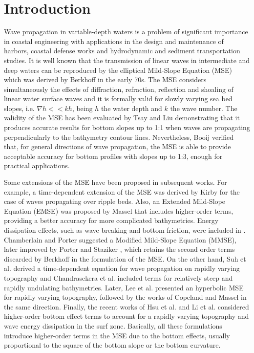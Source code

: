 \section{Introduction}
\label{sec-Introduction}
Wave propagation in variable-depth waters is a problem of significant importance in coastal engineering with applications in the design and maintenance of harbors, coastal defense works and hydrodynamic and sediment transportation studies. It is well known that the transmission of linear waves in intermediate and deep waters can be reproduced by the elliptical Mild-Slope Equation (MSE) which was derived by Berkhoff \cite{Berkhoff1972} in the early 70s. The MSE considers simultaneously the effects of diffraction, refraction, reflection and shoaling of linear water surface waves and it is formally valid for slowly varying sea bed slopes, i.e. $\nabla h << kh$, being $h$ the water depth and $k$ the wave number. The validity of the MSE has been evaluated by Tsay and Liu \cite{Tsay1983} demonstrating that it produces accurate results for bottom slopes up to 1:1 when waves are propagating perpendicularly to the bathymetry contour lines. Nevertheless, Booij \cite{Booij1983} verified that, for general directions of wave propagation, the MSE is able to provide acceptable accuracy for bottom profiles with slopes up to 1:3, enough for practical applications.

Some extensions of the MSE have been proposed in subsequent works. For example, a time-dependent extension of the MSE was derived by Kirby \cite{Kirby1986-JFM} for the case of waves propagating over ripple beds.  Also, an Extended Mild-Slope Equation (EMSE) was proposed by Massel \cite{Massel1993} that includes higher-order terms, providing a better accuracy for more complicated bathymetries. Energy dissipation effects, such as wave breaking and bottom friction, were included in \cite{Maa2002}. Chamberlain and Porter \cite{Chamberlain1995} suggested a Modified Mild-Slope Equation (MMSE), later improved by Porter and Staziker \cite{Porter1995}, which retains the second order terms discarded by Berkhoff in the formulation of the MSE. On the other hand, Suh et al. \cite{Suh1997} derived a time-dependent equation for wave propagation on rapidly varying topography and Chandrasekera et al. \cite{Chandrasekera1997} included terms for relatively steep and rapidly undulating bathymetries. Later, Lee et al. \cite{Lee1998} presented an hyperbolic MSE for rapidly varying topography, followed by the works of Copeland \cite{Copeland1985} and Massel \cite{Massel1993} in the same direction. Finally, the recent works of Hsu et al. \cite{Hsu2001} and Li et al. \cite{Li1994,Hsu2000} considered higher-order bottom effect terms to account for a rapidly varying topography and wave energy dissipation in the surf zone. Basically, all these formulations introduce higher-order terms in the MSE due to the bottom effects, usually proportional to the square of the bottom slope or the bottom curvature.

